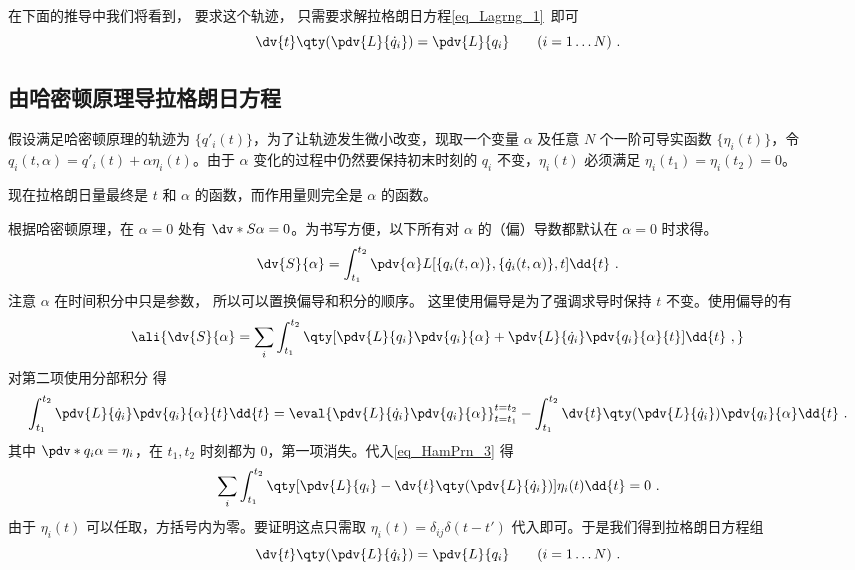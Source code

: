 在下面的推导中我们将看到， 要求这个轨迹， 只需要求解拉格朗日方程\autoref{eq_Lagrng_1}~即可
\begin{equation}\label{eq_HamPrn_4}
\dv{t} \qty(\pdv{L}{\dot q_i}) = \pdv{L}{q_i} \qquad
(i = 1\dots N)~.
\end{equation}

\subsection{由哈密顿原理导拉格朗日方程}

假设满足哈密顿原理的轨迹为 $\{q'_i(t)\}$，为了让轨迹发生微小改变，现取一个变量 $\alpha$ 及任意 $N$ 个一阶可导实函数 $\{\eta_i(t)\}$，令 $q_i(t,\alpha ) = q'_i(t) + \alpha \eta_i(t)$。由于 $\alpha$ 变化的过程中仍然要保持初末时刻的 $q_i$ 不变，$\eta_i(t)$ 必须满足 $\eta_i(t_1) = \eta_i(t_2) = 0$。

现在拉格朗日量最终是 $t$ 和 $\alpha$ 的函数，而作用量则完全是 $\alpha$ 的函数。
 
根据哈密顿原理，在 $\alpha = 0$ 处有 $\dv*{S}{\alpha} = 0$。为书写方便，以下所有对 $\alpha$ 的（偏）导数都默认在 $\alpha=0$ 时求得。
\begin{equation}
\dv{S}{\alpha} = \int_{t_1}^{t_2} \pdv{\alpha} L[\{q_i(t,\alpha )\}, \{\dot q_i(t,\alpha)\}, t] \dd{t}~.
\end{equation}
注意 $\alpha$ 在时间积分中只是参数， 所以可以置换偏导和积分的顺序。 %
这里使用偏导是为了强调求导时保持 $t$ 不变。使用偏导的有
\begin{equation}\label{eq_HamPrn_3}
\ali{
\dv{S}{\alpha} =
\sum_i \int_{t_1}^{t_2} \qty[\pdv{L}{q_i} \pdv{q_i}{\alpha} + \pdv{L}{\dot q_i}\pdv{q_i}{\alpha}{t}] \dd{t}~,
}\end{equation}
对第二项使用分部积分 得
\begin{equation}
\int_{t_1}^{t_2} \pdv{L}{\dot q_i} \pdv{q_i}{\alpha}{t} \dd{t}  = \eval{\pdv{L}{\dot q_i}\pdv{q_i}{\alpha}}_{t = t_1}^{t = t_2} - \int_{t_1}^{t_2} \dv{t} \qty(\pdv{L}{\dot q_i})\pdv{q_i}{\alpha} \dd{t}~.
\end{equation}
其中 $\pdv*{q_i}{\alpha}  = \eta_i$，在 $t_1, t_2$ 时刻都为 0，第一项消失。代入\autoref{eq_HamPrn_3} 得
\begin{equation}
\sum_i \int_{t_1}^{t_2} \qty[\pdv{L}{q_i} - \dv{t} \qty(\pdv{L}{\dot q_i})] \eta_i(t) \dd{t} = 0~.
\end{equation}
由于 $\eta_i(t)$ 可以任取，方括号内为零。要证明这点只需取 $\eta_i(t) = \delta_{ij}\delta(t - t')$ 代入即可。于是我们得到拉格朗日方程组
\begin{equation}\label{eq_HamPrn_2}
\dv{t} \qty(\pdv{L}{\dot q_i}) = \pdv{L}{q_i} \qquad
(i = 1\dots N)~.
\end{equation}
